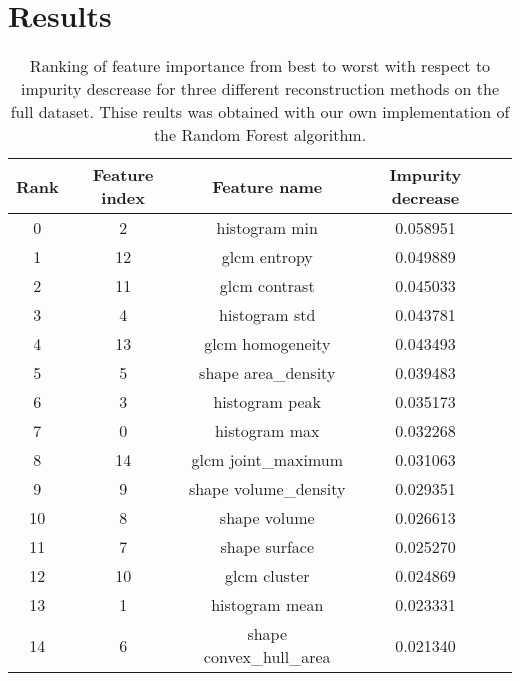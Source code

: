 \section{Results}


\begin{table}
    \centering
    \centering
    \caption{Ranking of feature importance from best to worst with respect to
    impurity descrease for three different reconstruction methods on the full
    dataset. Thise reults was obtained with our own implementation of the
Random Forest algorithm. }  
    \label{tab:feature_importance_own}  

    \begin{tabular}{|c|c|c|c|c|}
        \hline
        Rank & Feature index & Feature name & Impurity decrease \\     
        \hline
            0       & 2           & histogram min  & 0.058951 \\ 
            1      & 12            & glcm entropy  & 0.049889  \\ 
            2      & 11           & glcm contrast  & 0.045033  \\ 
            3       & 4           & histogram std  & 0.043781  \\ 
            4      & 13        & glcm homogeneity  & 0.043493  \\ 
            5       & 5      & shape area\_density  & 0.039483  \\ 
            6       & 3          & histogram peak  & 0.035173  \\ 
            7       & 0           & histogram max  & 0.032268  \\ 
            8      & 14      & glcm joint\_maximum  & 0.031063  \\ 
            9       & 9    & shape volume\_density  & 0.029351  \\ 
            10      & 8            & shape volume  & 0.026613  \\ 
            11      & 7           & shape surface  & 0.025270  \\ 
            12     & 10            & glcm cluster  & 0.024869  \\ 
            13      & 1          & histogram mean  & 0.023331  \\ 
            14      & 6  & shape convex\_hull\_area  & 0.021340  \\ 
        \hline
    \end{tabular} 
\end{table}



